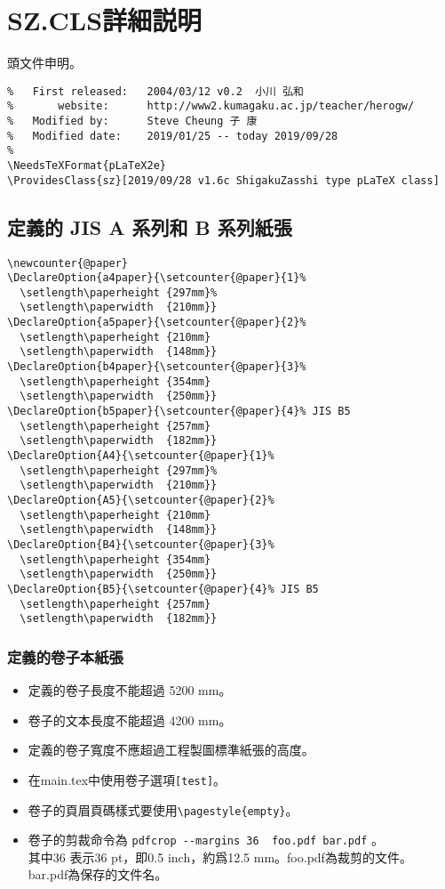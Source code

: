 \section{SZ.CLS詳細説明}
\par 頭文件申明。
\begin{lstlisting}[firstnumber=1]
%   File:             ShigakuZasshi type pLaTeX class
%   First released:   2004/03/12 v0.2  小川 弘和
%       website:      http://www2.kumagaku.ac.jp/teacher/herogw/
%   Modified by:      Steve Cheung 子 康
%   Modified date:    2019/01/25 -- today 2019/09/28
%
\NeedsTeXFormat{pLaTeX2e}
\ProvidesClass{sz}[2019/09/28 v1.6c ShigakuZasshi type pLaTeX class]
\end{lstlisting}

\subsection{定義的 JIS A 系列和 B 系列紙張}
\begin{lstlisting}[firstnumber=11]
\newcounter{@paper}
\DeclareOption{a4paper}{\setcounter{@paper}{1}%
  \setlength\paperheight {297mm}%
  \setlength\paperwidth  {210mm}}
\DeclareOption{a5paper}{\setcounter{@paper}{2}%
  \setlength\paperheight {210mm}
  \setlength\paperwidth  {148mm}}
\DeclareOption{b4paper}{\setcounter{@paper}{3}%
  \setlength\paperheight {354mm}
  \setlength\paperwidth  {250mm}}
\DeclareOption{b5paper}{\setcounter{@paper}{4}% JIS B5
  \setlength\paperheight {257mm}
  \setlength\paperwidth  {182mm}}
\DeclareOption{A4}{\setcounter{@paper}{1}%
  \setlength\paperheight {297mm}%
  \setlength\paperwidth  {210mm}}
\DeclareOption{A5}{\setcounter{@paper}{2}%
  \setlength\paperheight {210mm}
  \setlength\paperwidth  {148mm}}
\DeclareOption{B4}{\setcounter{@paper}{3}%
  \setlength\paperheight {354mm}
  \setlength\paperwidth  {250mm}}
\DeclareOption{B5}{\setcounter{@paper}{4}% JIS B5
  \setlength\paperheight {257mm}
  \setlength\paperwidth  {182mm}}
\end{lstlisting}

\subsubsection{定義的卷子本紙張}
\par{}
\begin{itemize}
\item 定義的卷子長度不能超過 5200 mm。
\item 卷子的文本長度不能超過 4200 mm。
\item 定義的卷子寬度不應超過工程製圖標準紙張的高度。
\item	在main.tex中使用卷子選項\verb+[test]+。
\item 卷子的頁眉頁碼樣式要使用\verb+\pagestyle{empty}+。
\item 卷子的剪裁命令為 {\color{red}\verb+pdfcrop --margins 36  foo.pdf bar.pdf+} 。\\
其中36 表示36 pt，即0.5 inch，約爲12.5 mm。foo.pdf為裁剪的文件。
bar.pdf為保存的文件名。
\end{itemize}

